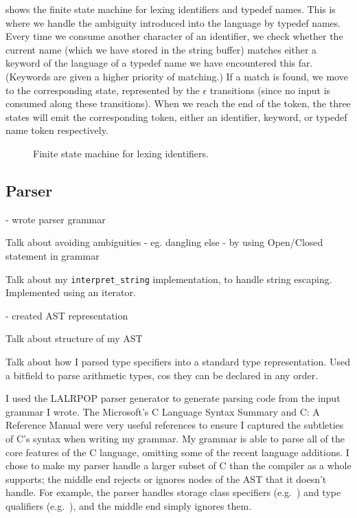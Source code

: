 \documentclass[00-main.tex]{subfiles}
\begin{document}
 shows the finite state machine for lexing identifiers and typedef names.
This is where we handle the ambiguity introduced into the language by typedef names.
  Every time we consume another character of an identifier, we check whether the current name (which we have stored in the string buffer) matches either a keyword of the language of a typedef name we have encountered this far.
(Keywords are given a higher priority of matching.)
  If a match is found, we move to the corresponding state, represented by the $\epsilon$ transitions (since no input is consumed along these transitions).
When we reach the end of the token, the three states will emit the corresponding token, either an identifier, keyword, or typedef name token respectively.

\begin{figure}[ht]
  \centering
  \caption{Finite state machine for lexing identifiers.}
  \label{fig:lexing identifiers fsm}
\end{figure}


\subsection{Parser}

\begin{Comment}
- wrote parser grammar

Talk about avoiding ambiguities - eg. dangling else - by using Open/Closed statement in grammar

Talk about my \texttt{interpret\_string} implementation, to handle string escaping. Implemented using an iterator.

- created AST representation

Talk about structure of my AST

Talk about how I parsed type specifiers into a standard type representation. Used a bitfield to parse arithmetic types, cos they can be declared in any order.
\end{Comment}

I used the LALRPOP parser generator  to generate parsing code from the input grammar I wrote.
The Microsoft's C Language Syntax Summary  and C: A Reference Manual  were very useful references to ensure I captured the subtleties of C's syntax when writing my grammar.
My grammar is able to parse all of the core features of the C language, omitting some of the recent language additions. I chose to make my parser handle a larger subset of C than the compiler as a whole supports; the middle end rejects or ignores nodes of the AST that it doesn't handle. For example, the parser handles storage class specifiers (e.g.\ ) and type qualifiers (e.g.\ ), and the middle end simply ignores them.
\end{document}
